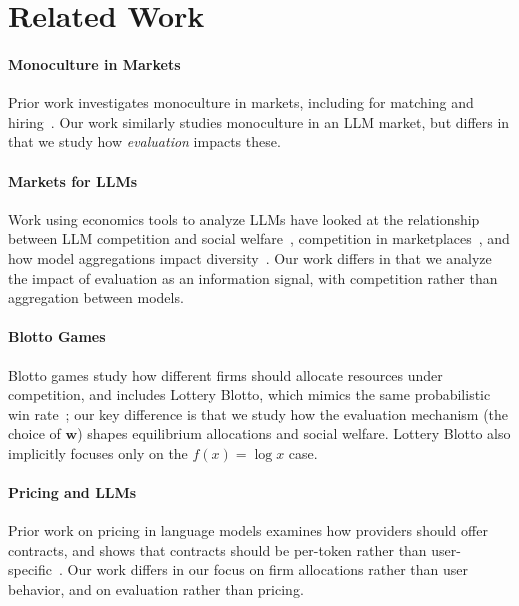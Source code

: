 \documentclass[msom,blindrev]{informs3_ExtAbst}
\begin{document}
\section{Related Work}
\paragraph{Monoculture in Markets}
Prior work investigates monoculture in markets, including for matching and hiring~\citep{monoculture_matching,monoculture_social_welfare}. 
Our work similarly studies monoculture in an LLM market, but differs in that we study how \textit{evaluation} impacts these. 

\paragraph{Markets for LLMs}
Work using economics tools to analyze LLMs have looked at the relationship between LLM competition and social welfare~\citep{bayes_risk}, competition in marketplaces~\citep{competition_alignment}, and how model aggregations impact diversity~\citep{aggregation_model_diversity}. 
Our work differs in that we analyze the impact of evaluation as an information signal, with competition rather than aggregation between models. 

\paragraph{Blotto Games}
Blotto games study how different firms should allocate resources under competition, and includes Lottery Blotto, which mimics the same probabilistic win rate~\citep{lottery_blotto}; our key difference is that we study how the evaluation mechanism (the choice of $\mathbf{w}$) shapes equilibrium allocations and social welfare.
Lottery Blotto also implicitly focuses only on the $f(x) = \log x$ case. 

\paragraph{Pricing and LLMs}
Prior work on pricing in language models examines how providers should offer contracts, and shows that contracts should be per-token rather than user-specific~\citep{menu_pricing}. 
Our work differs in our focus on firm allocations rather than user behavior, and on evaluation rather than pricing. 



\end{document}
